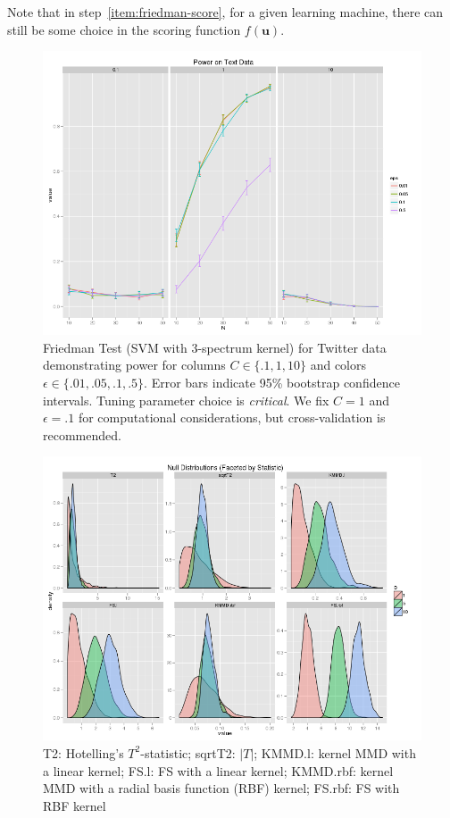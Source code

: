 Note that in step~\ref{item:friedman-score}, for a given learning
machine, there can still be some choice in the scoring function
$f(\mathbf{u})$.

\begin{figure}
  \centering
  \includegraphics[width=\linewidth]{power_kpar.png}
  \caption{Friedman Test (SVM with 3-spectrum kernel) for Twitter data
    demonstrating power for columns $C \in \{.1, 1, 10\}$ and colors
    $\epsilon \in \{.01, .05, .1, .5\}$.  Error bars indicate 95\%
    bootstrap confidence intervals.  Tuning parameter choice is
    \emph{critical}.  We fix $C = 1$ and $\epsilon = .1$ for
    computational considerations, but cross-validation is
    recommended.}
  \label{fig:power_kpar}
\end{figure}

\begin{figure}
  \centering
  \includegraphics[width=.8\linewidth]{null_dist.png}
  \caption{T2: Hotelling's $T^2$-statistic; sqrtT2: $|T|$;
    KMMD.l: kernel MMD with a linear kernel; FS.l: FS with a
  linear kernel; KMMD.rbf: kernel MMD with a radial basis function (RBF) kernel;
  FS.rbf: FS with RBF kernel}
  \label{fig:null_dist}
\end{figure}

